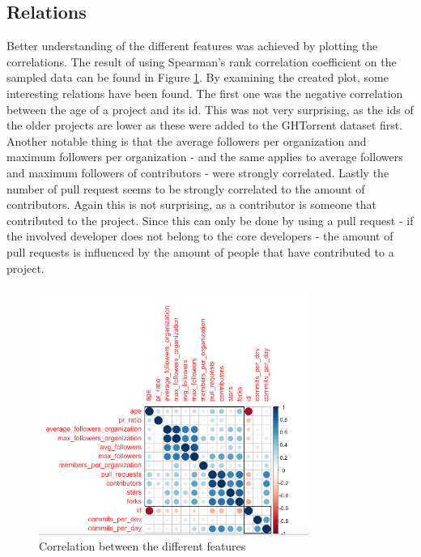     \subsection{Relations}
    Better understanding of the different features was achieved by plotting the correlations.
    The result of using Spearman's rank correlation coefficient \cite{daniel-1990} on the sampled data can be found in Figure \ref{fig:correlation-plot}.
    By examining the created plot, some interesting relations have been found.
    The first one was the negative correlation between the age of a project and its id.
    This was not very surprising, as the ids of the older projects are lower as these were added to the GHTorrent dataset first.
    Another notable thing is that the average followers per organization and maximum followers per organization - and the same applies to average followers and maximum followers of contributors - were strongly correlated. 
    Lastly the number of pull request seems to be strongly correlated to the amount of contributors.
    Again this is not surprising, as a contributor is someone that contributed to the project. 
    Since this can only be done by using a pull request - if the involved developer does not belong to the core developers - the amount of pull requests is influenced by the amount of people that have contributed to a project.
    \begin{figure}[h!]
	    \includegraphics[width=250pt]{figures/correlation}
	    \caption{Correlation between the different features}
        \label{fig:correlation-plot}
	\end{figure}

